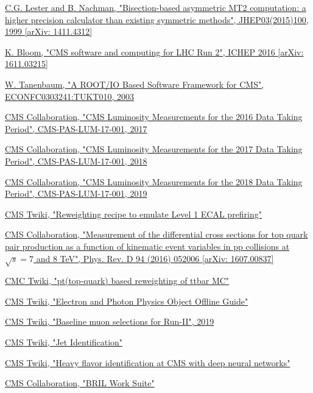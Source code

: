\documentclass[a4paper, 10pt, openright]{report}
\begin{document}
\begin{thebibliography}{1}
\href{https://arxiv.org/abs/1411.4312}{C.G. Lester and B. Nachman,
"Bisection-based asymmetric MT2 computation: a higher precision calculator than existing symmetric methods",
JHEP03(2015)100, 1999 [arXiv: 1411.4312]}

\href{https://arxiv.org/abs/1611.03215}{K. Bloom,
"CMS software and computing for LHC Run 2",
ICHEP 2016 [arXiv: 1611.03215]}

\href{https://arxiv.org/abs/cs/0306034}{W. Tanenbaum,
"A ROOT/IO Based Software Framework for CMS",
ECONFC0303241:TUKT010, 2003}

\href{https://cds.cern.ch/record/2257069}{CMS Collaboration,
"CMS Luminosity Measurements for the 2016 Data Taking Period",
CMS-PAS-LUM-17-001, 2017}

\href{http://inspirehep.net/record/1677076}{CMS Collaboration,
"CMS Luminosity Measurements for the 2017 Data Taking Period",
CMS-PAS-LUM-17-001, 2018}

\href{http://inspirehep.net/record/1736713/}{CMS Collaboration,
"CMS Luminosity Measurements for the 2018 Data Taking Period",
CMS-PAS-LUM-17-001, 2019}

\href{https://twiki.cern.ch/twiki/bin/view/CMS/L1ECALPrefiringWeightRecipe}{\ac{CMS} Twiki,
"Reweighting recipe to emulate Level 1 ECAL prefiring"}

\href{https://arxiv.org/abs/1607.00837}{CMS Collaboration,
"Measurement of the differential cross sections for top quark pair production as a function of kinematic event variables in pp collisions at $\sqrt{s} = 7$ and 8 TeV",
Phys. Rev. D 94 (2016) 052006 [arXiv: 1607.00837]}

\href{https://twiki.cern.ch/twiki/bin/viewauth/CMS/TopPtReweighting}{\ac{CMC} Twiki,
"pt(top-quark) based reweighting of ttbar MC"}

\href{https://twiki.cern.ch/twiki/bin/view/CMSPublic/SWGuideEgamma}{\ac{CMS} Twiki,
"Electron and Photon Physics Object Offline Guide"}

\href{https://twiki.cern.ch/twiki/bin/viewauth/CMS/SWGuideMuonIdRun2}{\ac{CMS} Twiki,
"Baseline muon selections for Run-II", 2019}

\href{https://twiki.cern.ch/twiki/bin/view/CMS/JetID}{\ac{CMS} Twiki,
"Jet Identification"}

\href{https://twiki.cern.ch/twiki/bin/view/CMSPublic/BTV13TeVDPDeepCSV}{\ac{CMS} Twiki,
"Heavy flavor identification at CMS with deep neural networks"}


\href{https://cms-service-lumi.web.cern.ch/cms-service-lumi/brilwsdoc.html}{CMS Collaboration,
"BRIL Work Suite"}

\end{thebibliography}
\end{document}

